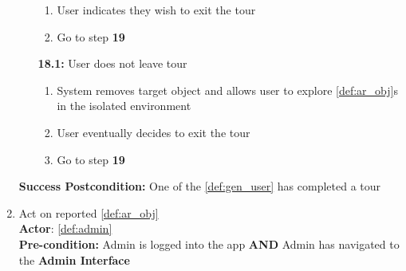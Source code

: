 \documentclass{article}
\begin{document}
\begin{enumerate}[label=\textbf{UC\arabic*}]
\begin{itemize}
            \begin{enumerate}[label=\textbf{\arabic*.}]
                \item User indicates they wish to exit the tour
                \item Go to step \textbf{19}
            \end{enumerate}
            \item[{\bf 18.1:}] User does not leave tour
            \begin{enumerate}[label=\textbf{\arabic*.}]
                \item System removes target object and allows user to explore \ref{def:ar_obj}s in the isolated environment
                \item User eventually decides to exit the tour
                \item Go to step \textbf{19}
            \end{enumerate}
        \end{itemize}
        \textbf{Success Postcondition:} One of the \ref{def:gen_user} has completed a tour

    \item \label{uc:26}  Act on reported \ref{def:ar_obj} \\
        \textbf{Actor}: \ref{def:admin} \\
        \textbf{Pre-condition:} Admin is logged into the app \textbf{AND} Admin has navigated to the \textbf{Admin Interface} \\
    

\end{enumerate}
\end{document}
